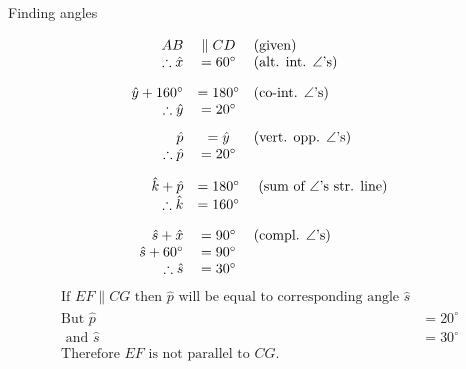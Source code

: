 \begin{wex}{Finding angles}
{\begin{center}
{}
 \end{center}
} 
{

\begin{equation*}
\begin{array}{rcl}
AB &\parallel CD & \mbox{(given)} \\
\therefore \hat{x}&=60^{\circ} & \mbox{(alt. int. $\angle$'s)}  \vspace{10pt} \\

\hat{y} + 160^\circ &= 180^{\circ}  & \mbox{(co-int. $\angle$'s)} \\
\therefore \hat{y} &= 20^{\circ} &   \vspace{8pt}\\


\hat{p} &= \hat{y} & \mbox{(vert. opp. $\angle$'s)} \\
\therefore \hat{p} &= 20^{\circ} &  \vspace{10pt}\\



 \hat{k} + \hat{p} &= 180^{\circ}  &\mbox{ (sum of $\angle$'s str. line)} \\
\therefore \hat{k} &= 160^{\circ} &  \vspace{10pt}\\


 \hat{s} + \hat{x} &= 90^{\circ}  & \mbox{(compl. $\angle$'s)} \\ 
 \hat{s} + 60^\circ &= 90^{\circ} & \\
\therefore \hat{s} &= 30^{\circ} &  
\end{array}
\end{equation*} 
\begin{equation*}
\begin{array}{rl}
\mbox{If }EF \parallel CG \mbox{ then } \hat{p} \mbox{ will be equal to corresponding angle } \hat{s}  \\
\mbox{But }\hat{p} &= 20^{\circ} \\
\mbox{ and } \hat{s}&= 30^{\circ} \\
\mbox{Therefore }EF \mbox{ is not parallel to } CG.&
\end{array}
\end{equation*} 
}
\end{wex}


